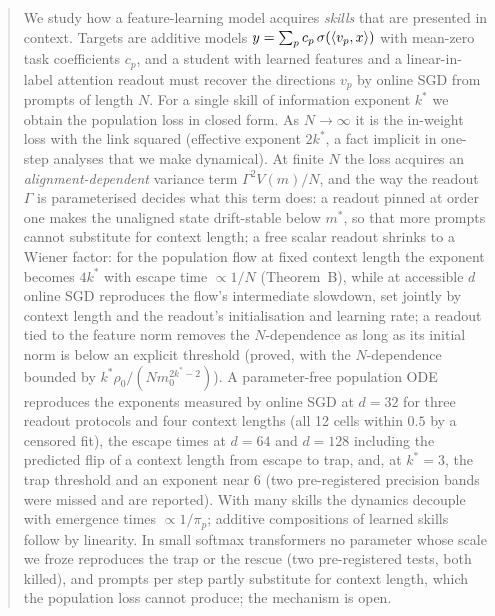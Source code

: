 \begin{abstract}
We study how a feature-learning model acquires \emph{skills} that are presented in context. Targets are additive models
$y=\sum_p c_p\,\sg(\langle v_p,x\rangle)$ with mean-zero task coefficients $c_p$, and a student with learned features and a
linear-in-label attention readout must recover the directions $v_p$ by online SGD from prompts of length $N$. For a single
skill of information exponent $k^*$ we obtain the population loss in closed form. As $N\to\infty$ it is the in-weight loss with the
link squared (effective exponent $2k^*$, a fact implicit in one-step analyses that we make dynamical). At finite $N$ the loss
acquires an \emph{alignment-dependent} variance term $\Gamma^2V(m)/N$, and the way the readout $\Gamma$ is parameterised decides what
this term does: a readout pinned at order one makes the unaligned state drift-stable below $m^*$, so that more prompts cannot
substitute for context length; a free scalar readout shrinks to a Wiener factor: for the population flow at fixed context length the exponent becomes $4k^*$ with escape time $\propto1/N$ (Theorem~B), while at accessible $d$ online SGD reproduces the flow's intermediate slowdown, set jointly by context length and the readout's initialisation and learning rate; a readout tied to the feature
norm removes the $N$-dependence as long as its initial norm is below an explicit threshold (proved, with the $N$-dependence bounded by $k^*\rho_0/(Nm_0^{2k^*-2})$). A parameter-free population ODE reproduces the exponents measured by online SGD at
$d=32$ for three readout protocols and four context lengths (all 12 cells within $0.5$ by a censored fit), the escape times at $d=64$ and $d=128$ including the predicted flip of a context length from escape to trap, and, at $k^*=3$, the trap threshold and an exponent near $6$ (two pre-registered precision bands were missed and are reported). With
many skills the dynamics decouple with emergence times $\propto1/\pi_p$; additive compositions of learned skills follow by linearity.
In small softmax transformers no parameter whose scale we froze reproduces the trap or the rescue (two pre-registered tests, both killed), and prompts per step partly substitute for context length, which the population loss cannot produce; the mechanism is open.
\end{abstract}

